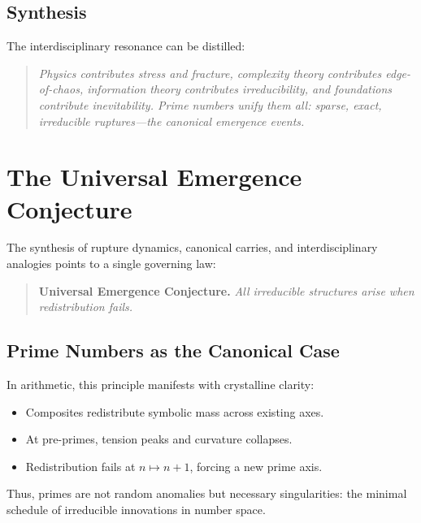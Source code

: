 \documentclass[11pt]{article}
\theoremstyle{plain}
\theoremstyle{definition}
\begin{document}
\subsection{Synthesis}
The interdisciplinary resonance can be distilled:
\begin{quote}
\emph{Physics contributes stress and fracture, complexity theory contributes edge-of-chaos, information theory contributes irreducibility, and foundations contribute inevitability.  
Prime numbers unify them all: sparse, exact, irreducible ruptures—the canonical emergence events.}
\end{quote}

\section{The Universal Emergence Conjecture}

The synthesis of rupture dynamics, canonical carries, and interdisciplinary analogies points to a single governing law:

\begin{quote}
\textbf{Universal Emergence Conjecture.}  
\emph{All irreducible structures arise when redistribution fails.}
\end{quote}

\subsection{Prime Numbers as the Canonical Case}
In arithmetic, this principle manifests with crystalline clarity:
\begin{itemize}
  \item Composites redistribute symbolic mass across existing axes.  
  \item At pre-primes, tension peaks and curvature collapses.  
  \item Redistribution fails at $n \mapsto n+1$, forcing a new prime axis.  
\end{itemize}
Thus, primes are not random anomalies but necessary singularities: the minimal schedule of irreducible innovations in number space.
\end{document}

